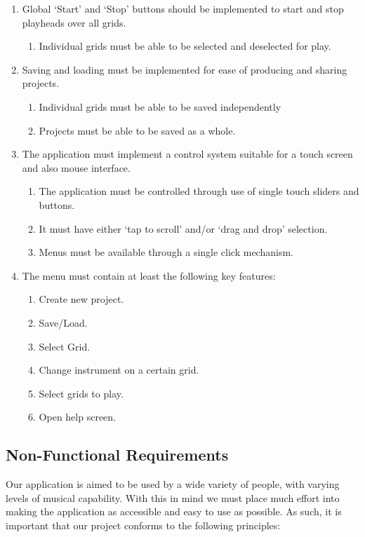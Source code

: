 \documentclass[10pt,a4paper]{article}
\begin{document}
\begin{enumerate}
\item Global `Start' and `Stop' buttons should be implemented to start and stop playheads over all grids.
\begin{enumerate}
\item Individual grids must be able to be selected and deselected for play.
\end{enumerate}

\item Saving and loading must be implemented for ease of producing and sharing projects.
\begin{enumerate}
\item Individual grids must be able to be saved independently
\item Projects must be able to be saved as a whole.
\end{enumerate}

\item The application must implement a control system suitable for a touch screen and also mouse interface.
\begin{enumerate}
\item The application must be controlled through use of single touch sliders and buttons.
\item It must have either `tap to scroll' and/or `drag and drop' selection.
\item Menus must be available through a single click mechanism.
\end{enumerate}

\item The menu must contain at least the following key features:
\begin{enumerate}
\item Create new project.
\item Save/Load.
\item Select Grid.
\item Change instrument on a certain grid.
\item Select grids to play.
\item Open help screen.
\end{enumerate}

\end{enumerate}
\subsection{Non-Functional Requirements}
Our application is aimed to be used by a wide variety of people, with varying levels of musical capability. With this in mind we must place much effort into making the application as accessible and easy to use as possible. As such, it is important that our project conforms to the following principles:
\end{document}
